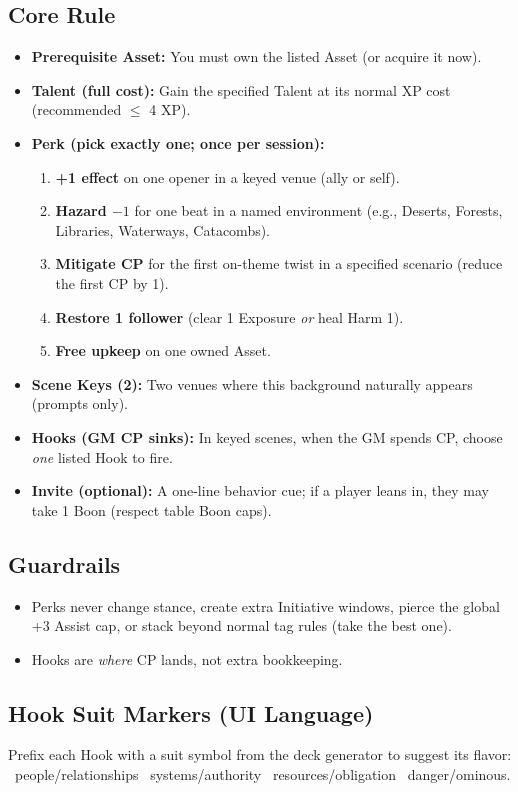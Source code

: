 \documentclass[11pt]{article}
\begin{document}
\subsection*{Core Rule}
\begin{itemize}
  \item \textbf{Prerequisite Asset:} You must own the listed Asset (or acquire it now).
  \item \textbf{Talent (full cost):} Gain the specified Talent at its normal XP cost (recommended $\leq$ 4 XP).
  \item \textbf{Perk (pick exactly one; once per session):}
    \begin{enumerate}
      \item \textbf{+1 effect} on one opener in a keyed venue (ally or self).
      \item \textbf{Hazard $-1$} for one beat in a named environment (e.g., Deserts, Forests, Libraries, Waterways, Catacombs).
      \item \textbf{Mitigate CP} for the first on-theme twist in a specified scenario (reduce the first CP by 1).
      \item \textbf{Restore 1 follower} (clear 1 Exposure \emph{or} heal Harm 1).
      \item \textbf{Free upkeep} on one owned Asset.
    \end{enumerate}
  \item \textbf{Scene Keys (2):} Two venues where this background naturally appears (prompts only).
  \item \textbf{Hooks (GM CP sinks):} In keyed scenes, when the GM spends CP, choose \emph{one} listed Hook to fire.
  \item \textbf{Invite (optional):} A one-line behavior cue; if a player leans in, they may take 1 Boon (respect table Boon caps).
\end{itemize}

\subsection*{Guardrails}
\begin{itemize}
  \item Perks never change stance, create extra Initiative windows, pierce the global +3 Assist cap, or stack beyond normal tag rules (take the best one).
  \item Hooks are \emph{where} CP lands, not extra bookkeeping.
\end{itemize}

\subsection*{Hook Suit Markers (UI Language)}
Prefix each Hook with a suit symbol from the deck generator to suggest its flavor:
\quad \heartsuit~people/relationships \quad \clubsuit~systems/authority \quad \diamondsuit~resources/obligation \quad \spadesuit~danger/ominous.
\end{document}
